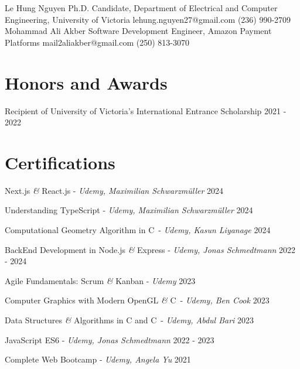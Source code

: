 \documentclass[a4paper,10pt]{article}
\begin{document}
\begin{references}
        {Le Hung Nguyen}
        {Ph.D. Candidate, Department of Electrical and}
        {Computer Engineering, University of Victoria}
        {lehung.nguyen27@gmail.com}
        {(236) 990-2709}
    \hfill
        {Mohammad Ali Akber}
        {Software Development Engineer,}
        {Amazon Payment Platforms}
        {mail2aliakber@gmail.com}
        {(250) 813-3070}
\end{references}

\section{Honors and Awards}
\honorsawards
{Recipient of University of Victoria’s International Entrance Scholarship}
{2021 - 2022}

\section{Certifications}

\honorsawards
{Next.js \textit{\&} React.js - \textit{Udemy, Maximilian Schwarzmüller}}
{2024}

\honorsawards
{Understanding TypeScript - \textit{Udemy, Maximilian Schwarzmüller}}
{2024}

\honorsawards
{Computational Geometry Algorithm in C\plusplus\ - \textit{Udemy, Kasun Liyanage}}
{2024}

\honorsawards
{BackEnd Development in Node.js \textit{\&} Express - \textit{Udemy, Jonas Schmedtmann}}
{2022 - 2024}

\honorsawards
{Agile Fundamentals: Scrum \textit{\&} Kanban - \textit{Udemy}}
{2023}

\honorsawards
{Computer Graphics with Modern OpenGL \textit{\&} C\plusplus\ - \textit{Udemy, Ben Cook}}
{2023}

\honorsawards
{Data Structures \textit{\&} Algorithms in C and C\plusplus\ - \textit{Udemy, Abdul Bari}}
{2023}

\honorsawards
{JavaScript ES6 - \textit{Udemy, Jonas Schmedtmann}}
{2022 - 2023}

\honorsawards
{Complete Web Bootcamp - \textit{Udemy, Angela Yu}}
{2021}
\end{document}
